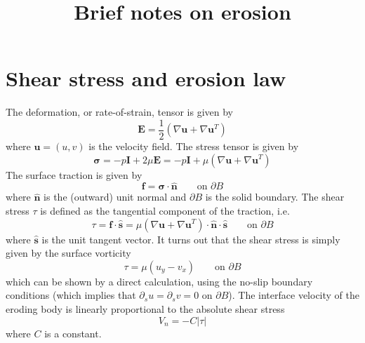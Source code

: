 \documentclass[11pt]{article}
\newcommand{\pdi}[2] { {\partial_#2} #1 }
\newcommand{\grad}{\nabla}
\newcommand{\bvec}[1]{\ensuremath{\boldsymbol{#1}}}
\newcommand{\abs}[1]{\left| #1 \right|}
\newcommand {\bu} {\bvec{u}}
\newcommand{\nhat}{\hat{\bvec{n}}}
\newcommand{\shat}{\hat{\bvec{s}}}
\newcommand{\atau}{\abs{\tau}}
\newcommand {\bdry} {\partial B}
\newcommand {\onBdry} {\text{on } \bdry }
\begin{document}
\title{Brief notes on erosion}
\author{}
\maketitle


\section{Shear stress and erosion law}
The deformation, or rate-of-strain, tensor is given by
\begin{equation}
\bvec{E} = \frac{1}{2} \left( \grad \bu + \grad \bu^T \right)
\end{equation}
where $\bu = (u,v)$ is the velocity field. The stress tensor is given by
\begin{equation}
\bvec{\sigma} = -p \bvec{I} + 2 \mu \bvec{E} = -p \bvec{I} + \mu \left( \grad \bu + \grad \bu^T \right)
\end{equation}
The surface traction is given by
\begin{equation}
\bvec{f} = \bvec{\sigma} \cdot \nhat 	\qquad \onBdry
\end{equation}
where $\nhat$ is the (outward) unit normal and $\bdry$ is the solid boundary. The shear stress $\tau$ is defined as the tangential component of the traction, i.e.~
\begin{equation}
\tau = \bvec{f} \cdot \shat 
= \mu \left( \grad \bu + \grad \bu^T \right) \cdot \nhat \cdot \shat	\qquad \onBdry
\end{equation}
where $\shat$ is the unit tangent vector. It turns out that the shear stress is simply given by the surface vorticity
\begin{equation}
\tau = \mu \left( u_y - v_x \right) \qquad \onBdry
\end{equation}
which can be shown by a direct calculation, using the no-slip boundary conditions (which implies that $\pdi{u}{s} = \pdi{v}{s} = 0$ on $\bdry$).
The interface velocity of the eroding body is linearly proportional to the absolute shear stress
\begin{equation}
V_n = -C \atau
\end{equation}
where $C$ is a constant.
\end{document}
